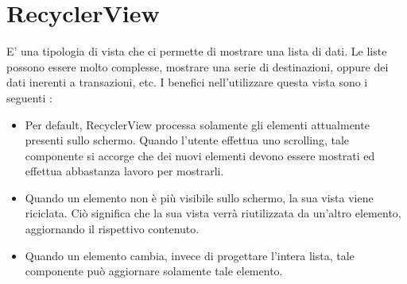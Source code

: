 \documentclass[12pt]{report}
\begin{document}
\section{RecyclerView}
E' una tipologia di vista che ci permette di mostrare una lista di dati. Le liste possono essere molto complesse, mostrare una serie di destinazioni, oppure dei dati inerenti a transazioni, etc. I benefici nell'utilizzare questa vista sono i seguenti :
\begin{itemize}
\item Per default, RecyclerView processa solamente gli elementi attualmente presenti sullo schermo. Quando l'utente effettua uno scrolling, tale componente si accorge che dei nuovi elementi devono essere mostrati ed effettua abbastanza lavoro per mostrarli.
\item Quando un elemento non è più visibile sullo schermo, la sua vista viene riciclata. Ciò significa che la sua vista verrà riutilizzata da un'altro elemento, aggiornando il rispettivo contenuto.
\item Quando un elemento cambia, invece di progettare l'intera lista, tale componente può aggiornare solamente tale elemento.
\end{itemize}
\end{document}
